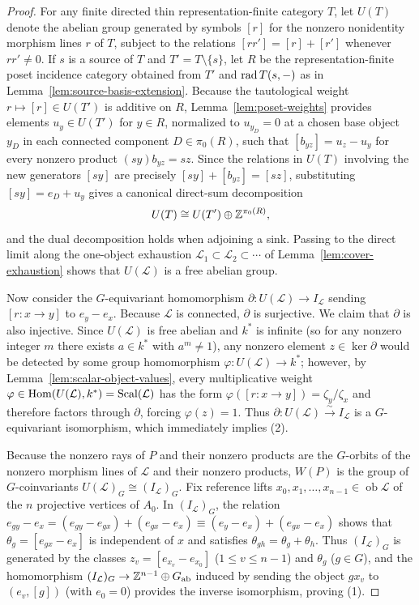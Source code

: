 \begin{proof}
For any finite directed thin representation-finite category $T$, let $U(T)$
denote the abelian group generated by symbols $[r]$ for the nonzero
nonidentity morphism lines $r$ of $T$, subject to the relations
$[rr']=[r]+[r']$ whenever $rr'\ne0$. If $s$ is a source of $T$ and
$T'=T\setminus\{s\}$, let $R$ be the representation-finite poset incidence
category obtained from $T'$ and $\operatorname{rad} T(s,-)$ as in
Lemma~\ref{lem:source-basis-extension}. Because the tautological weight
$r\mapsto[r]\in U(T')$ is additive on $R$, Lemma~\ref{lem:poset-weights}
provides elements $u_y\in U(T')$ for $y\in R$, normalized to $u_{y_D}=0$ at a
chosen base object $y_D$ in each connected component $D\in\pi_0(R)$, such
that $[b_{yz}]=u_z-u_y$ for every nonzero product $(sy)b_{yz}=sz$. Since
the relations in $U(T)$ involving the new generators $[sy]$ are precisely
$[sy]+[b_{yz}]=[sz]$, substituting $[sy]=e_D+u_y$ gives a canonical direct-sum
decomposition
\[
 U(T)\cong U(T')\oplus\mathbb Z^{\pi_0(R)},
\]
and the dual decomposition holds when adjoining a sink. Passing to the direct
limit along the one-object exhaustion $\mathcal L_1\subset\mathcal L_2\subset\cdots$
of Lemma~\ref{lem:cover-exhaustion} shows that $U(\mathcal L)$ is a free
abelian group.

Now consider the $G$-equivariant homomorphism
$\partial:U(\mathcal L)\to I_{\mathcal L}$ sending $[r:x\to y]$ to
$e_y-e_x$. Because $\mathcal L$ is connected, $\partial$ is surjective. We
claim that $\partial$ is also injective. Since $U(\mathcal L)$ is free
abelian and $k^*$ is infinite (so for any nonzero integer $m$ there exists
$a\in k^*$ with $a^m\ne1$), any nonzero element
$z\in\ker\partial$ would be detected by some group homomorphism
$\varphi:U(\mathcal L)\to k^*$; however, by
Lemma~\ref{lem:scalar-object-values}, every multiplicative weight
$\varphi\in\operatorname{Hom}(U(\mathcal L),k^*)=\operatorname{Scal}(\mathcal L)$ has the
form $\varphi([r:x\to y])=\zeta_y/\zeta_x$ and therefore factors through
$\partial$, forcing $\varphi(z)=1$. Thus $\partial:U(\mathcal L)\xrightarrow{\sim}I_{\mathcal L}$
is a $G$-equivariant isomorphism, which immediately implies (2).

Because the nonzero rays of $P$ and their nonzero products are the $G$-orbits
of the nonzero morphism lines of $\mathcal L$ and their nonzero products,
$W(P)$ is the group of $G$-coinvariants $U(\mathcal L)_G\cong(I_{\mathcal L})_G$.
Fix reference lifts $x_0,x_1,\ldots,x_{n-1}\in\operatorname{ob}\mathcal L$ of
the $n$ projective vertices of $A_0$. In $(I_{\mathcal L})_G$, the relation
$e_{gy}-e_x=(e_{gy}-e_{gx})+(e_{gx}-e_x)\equiv(e_y-e_x)+(e_{gx}-e_x)$ shows
that $\theta_g=[e_{gx}-e_x]$ is independent of $x$ and satisfies
$\theta_{gh}=\theta_g+\theta_h$. Thus $(I_{\mathcal L})_G$ is generated by
the classes $z_v=[e_{x_v}-e_{x_0}]$ ($1\leq v\leq n-1$) and $\theta_g$
($g\in G$), and the homomorphism $(I_{\mathcal L})_G\to\mathbb Z^{n-1}\oplus G_{\mathrm{ab}}$
induced by sending the object $gx_v$ to $(e_v,[g])$ (with $e_0=0$) provides
the inverse isomorphism, proving (1).
\end{proof}

